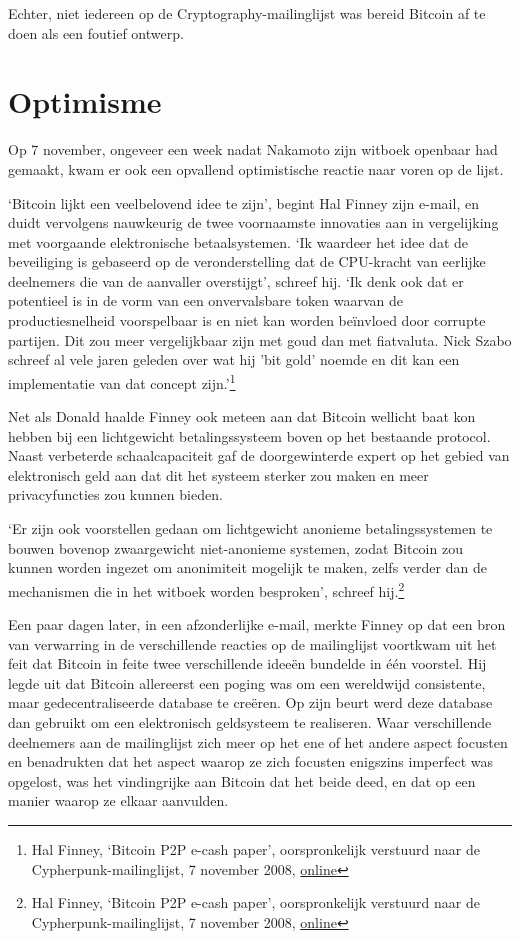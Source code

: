 \documentclass[smalldemyvopaper,11pt,twoside,onecolumn,openright,extrafontsizes,hidelinks]{memoir}
\begin{document}
Echter, niet iedereen op de Cryptography-mailinglijst was bereid Bitcoin
af te doen als een foutief ontwerp.

\section{Optimisme}\label{optimisme}

Op 7 november, ongeveer een week nadat Nakamoto zijn witboek openbaar
had gemaakt, kwam er ook een opvallend optimistische reactie naar voren
op de lijst.

`Bitcoin lijkt een veelbelovend idee te zijn', begint Hal Finney zijn
e-mail, en duidt vervolgens nauwkeurig de twee voornaamste innovaties
aan in vergelijking met voorgaande elektronische betaalsystemen. `Ik
waardeer het idee dat de beveiliging is gebaseerd op de veronderstelling
dat de CPU-kracht van eerlijke deelnemers die van de aanvaller
overstijgt', schreef hij. `Ik denk ook dat er potentieel is in de vorm
van een onvervalsbare token waarvan de productiesnelheid voorspelbaar is
en niet kan worden beïnvloed door corrupte partijen. Dit zou meer
vergelijkbaar zijn met goud dan met fiatvaluta. Nick Szabo schreef al
vele jaren geleden over wat hij 'bit gold' noemde en dit kan een
implementatie van dat concept zijn.'\footnote{Hal Finney, `Bitcoin P2P
  e-cash paper', oorspronkelijk verstuurd naar de
  Cypherpunk-mailinglijst, 7 november 2008,
  \href{https://www.metzdowd.com/pipermail/cryptography/2008-November/014827.html}{online}}

Net als Donald haalde Finney ook meteen aan dat Bitcoin wellicht baat
kon hebben bij een lichtgewicht betalingssysteem boven op het bestaande
protocol. Naast verbeterde schaalcapaciteit gaf de doorgewinterde expert
op het gebied van elektronisch geld aan dat dit het systeem sterker zou
maken en meer privacyfuncties zou kunnen bieden.

`Er zijn ook voorstellen gedaan om lichtgewicht anonieme
betalingssystemen te bouwen bovenop zwaargewicht niet-anonieme systemen,
zodat Bitcoin zou kunnen worden ingezet om anonimiteit mogelijk te
maken, zelfs verder dan de mechanismen die in het witboek worden
besproken', schreef hij.\footnote{Hal Finney, `Bitcoin P2P e-cash
  paper', oorspronkelijk verstuurd naar de Cypherpunk-mailinglijst, 7
  november 2008,
  \href{https://www.metzdowd.com/pipermail/cryptography/2008-November/014827.html}{online}}

Een paar dagen later, in een afzonderlijke e-mail, merkte Finney op dat
een bron van verwarring in de verschillende reacties op de mailinglijst
voortkwam uit het feit dat Bitcoin in feite twee verschillende ideeën
bundelde in één voorstel. Hij legde uit dat Bitcoin allereerst een
poging was om een wereldwijd consistente, maar gedecentraliseerde
database te creëren. Op zijn beurt werd deze database dan gebruikt om
een elektronisch geldsysteem te realiseren. Waar verschillende
deelnemers aan de mailinglijst zich meer op het ene of het andere aspect
focusten en benadrukten dat het aspect waarop ze zich focusten enigszins
imperfect was opgelost, was het vindingrijke aan Bitcoin dat het beide
deed, en dat op een manier waarop ze elkaar aanvulden.
\end{document}

